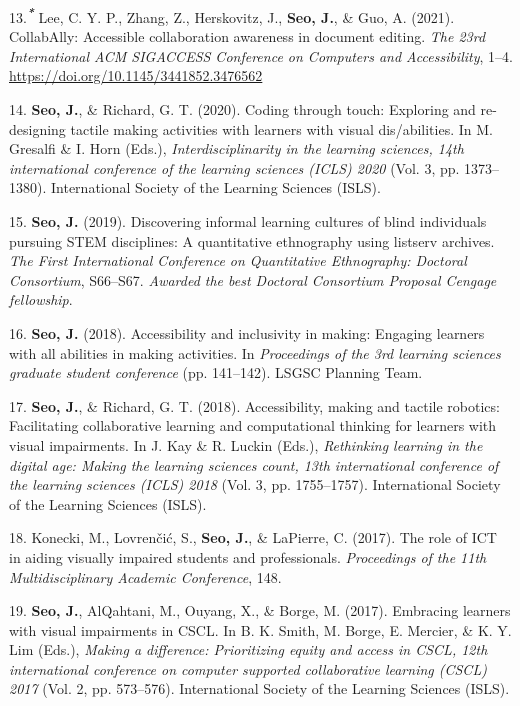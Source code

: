 \documentclass[11pt,a4paper,]{awesome-cv}
\newlength{\cslhangindent}
\newenvironment{CSLReferences}[2] %
 {\begin{list}{}{%
  \setlength{\itemindent}{0pt}
  \setlength{\leftmargin}{0pt}
  \setlength{\parsep}{0pt}
  \ifodd #1
   \setlength{\leftmargin}{\cslhangindent}
   \setlength{\itemindent}{-1\cslhangindent}
  \fi
  \setlength{\itemsep}{#2\baselineskip}}}
 {\end{list}}
\begin{document}
\begin{CSLReferences}{1}{0}
13.\textsuperscript{\textbf{\emph{*}}} Lee, C. Y. P., Zhang, Z.,
Herskovitz, J., \textbf{Seo, J.}, \& Guo, A. (2021). CollabAlly:
Accessible collaboration awareness in document editing. \emph{The 23rd
International ACM SIGACCESS Conference on Computers and Accessibility},
1--4. \url{https://doi.org/10.1145/3441852.3476562}

14. \textbf{Seo, J.}, \& Richard, G. T. (2020). Coding through touch:
Exploring and re-designing tactile making activities with learners with
visual dis/abilities. In M. Gresalfi \& I. Horn (Eds.),
\emph{Interdisciplinarity in the learning sciences, 14th international
conference of the learning sciences (ICLS) 2020} (Vol. 3, pp.
1373--1380). International Society of the Learning Sciences (ISLS).

15. \textbf{Seo, J.} (2019). Discovering informal learning cultures of
blind individuals pursuing STEM disciplines: A quantitative ethnography
using listserv archives. \emph{The First International Conference on
Quantitative Ethnography: Doctoral Consortium}, S66--S67. \emph{Awarded
the best Doctoral Consortium Proposal Cengage fellowship}.

16. \textbf{Seo, J.} (2018). Accessibility and inclusivity in making:
Engaging learners with all abilities in making activities. In
\emph{Proceedings of the 3rd learning sciences graduate student
conference} (pp. 141--142). LSGSC Planning Team.

17. \textbf{Seo, J.}, \& Richard, G. T. (2018). Accessibility, making
and tactile robotics: Facilitating collaborative learning and
computational thinking for learners with visual impairments. In J. Kay
\& R. Luckin (Eds.), \emph{Rethinking learning in the digital age:
Making the learning sciences count, 13th international conference of the
learning sciences (ICLS) 2018} (Vol. 3, pp. 1755--1757). International
Society of the Learning Sciences (ISLS).

18. Konecki, M., Lovrenčić, S., \textbf{Seo, J.}, \& LaPierre, C.
(2017). The role of ICT in aiding visually impaired students and
professionals. \emph{Proceedings of the 11th Multidisciplinary Academic
Conference}, 148.

19. \textbf{Seo, J.}, AlQahtani, M., Ouyang, X., \& Borge, M. (2017).
Embracing learners with visual impairments in CSCL. In B. K. Smith, M.
Borge, E. Mercier, \& K. Y. Lim (Eds.), \emph{Making a difference:
Prioritizing equity and access in CSCL, 12th international conference on
computer supported collaborative learning (CSCL) 2017} (Vol. 2, pp.
573--576). International Society of the Learning Sciences (ISLS).

\end{CSLReferences}
\end{document}

